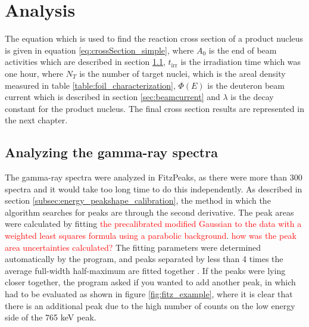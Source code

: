 \chapter{Analysis}\label{chapter:analysis} %

The equation which is used to find the reaction cross section of a product nucleus is given in equation \ref{eq:crossSection_simple}, where $A_0$ is the end of beam activities which are described in section \ref{sec:EOB_A0}, $t_\text{irr}$ is the irradiation time which was one hour, where $N_T$ is the number of target nuclei, which is the areal density measured in table \ref{table:foil_characterization}, $\Phi(E)$ is the deuteron beam current which is described in section \ref{sec:beamcurrent} and $\lambda$ is the decay constant for the product nucleus. The final cross section results are represented in the next chapter. 

\section{Analyzing the gamma-ray spectra} \label{sec:EOB_A0} 


\noindent 
The gamma-ray spectra were analyzed in FitzPeaks, as there were more than 300 spectra and it would take too long time to do this independently. As described in section \ref{subsec:energy_peakshape_calibration}, the method in which the algorithm searches for peaks are through the second derivative. The peak areas were calculated by fitting \textcolor{red}{the precalibrated modified Gaussian to the data with a weighted least squares formula using a parabolic background}. \textcolor{red}{how was the peak area uncertainties calculated?} The fitting parameters were determined automatically by the program, and peaks separated by less than 4 times the average full-width half-maximum are fitted together \cite{Koskelo1981}. If the peaks were lying closer together, the program asked if you wanted to add another peak, in which had to be evaluated as shown in figure \ref{fig:fitz_example}, where it is clear that there is an additional peak due to the high number of counts on the low energy side of the 765 keV peak. 

